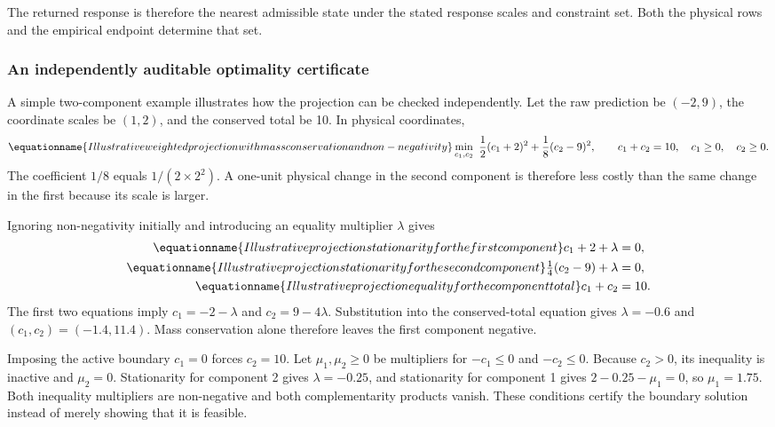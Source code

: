 The returned response is therefore the nearest admissible state under the stated response scales and constraint set. Both the physical rows and the empirical endpoint determine that set.

\subsubsection{An independently auditable optimality certificate}

A simple two-component example illustrates how the projection can be checked independently. Let the raw prediction be $(-2,9)$, the coordinate scales be $(1,2)$, and the conserved total be 10. In physical coordinates,
\begin{equation}
\equationname{Illustrative weighted projection with mass conservation and non-negativity}
\min_{c_1,c_2}\ \frac12(c_1+2)^2+\frac18(c_2-9)^2,
\qquad c_1+c_2=10,\quad c_1\ge0,\quad c_2\ge0.
\end{equation}
The coefficient $1/8$ equals $1/(2\times2^2)$. A one-unit physical change in the second component is therefore less costly than the same change in the first because its scale is larger.

Ignoring non-negativity initially and introducing an equality multiplier $\lambda$ gives
\begin{align}
\equationname{Illustrative projection stationarity for the first component}
c_1+2+\lambda&=0,\\
\equationname{Illustrative projection stationarity for the second component}
\tfrac14(c_2-9)+\lambda&=0,\\
\equationname{Illustrative projection equality for the component total}
c_1+c_2&=10.
\end{align}
The first two equations imply $c_1=-2-\lambda$ and $c_2=9-4\lambda$. Substitution into the conserved-total equation gives $\lambda=-0.6$ and $(c_1,c_2)=(-1.4,11.4)$. Mass conservation alone therefore leaves the first component negative.

Imposing the active boundary $c_1=0$ forces $c_2=10$. Let $\mu_1,\mu_2\ge0$ be multipliers for $-c_1\le0$ and $-c_2\le0$. Because $c_2>0$, its inequality is inactive and $\mu_2=0$. Stationarity for component 2 gives $\lambda=-0.25$, and stationarity for component 1 gives $2-0.25-\mu_1=0$, so $\mu_1=1.75$. Both inequality multipliers are non-negative and both complementarity products vanish. These conditions certify the boundary solution instead of merely showing that it is feasible.

